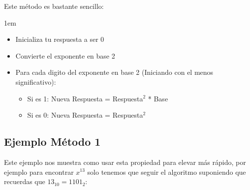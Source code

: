 \documentclass[12pt, fleqn]{report}                             %
\newenvironment{SmallIndentation}[1][0.75em]                    %
    {\begin{adjustwidth}{#1}{}\begin{footnotesize}}                 %
    {\end{footnotesize}\end{adjustwidth}}                           %
\begin{document}
            Este método es bastante sencillo:

            \begin{SmallIndentation}[1em]
                
                \begin{itemize}
                    \item   Inicializa tu respuesta a ser 0
                    \item   Convierte el exponente en base 2

                    \item Para cada digito del exponente en base 2 (Iniciando con
                          el menos significativo):
                        
                        \begin{itemize}
                            \item Si es 1: Nueva Respuesta = Respuesta$^2$ * Base 
                            \item Si es 0: Nueva Respuesta = Respuesta$^2$ 
                        \end{itemize}
                \end{itemize}

            \end{SmallIndentation}


            


        \subsection*{Ejemplo Método 1}



            Este ejemplo nos muestra como usar esta propiedad para elevar más rápido, por ejemplo para encontrar
            $x^{13}$ solo tenemos que seguir el algoritmo suponiendo que recuerdas que $13_{10} = 1101_{2}$:
\end{document}
